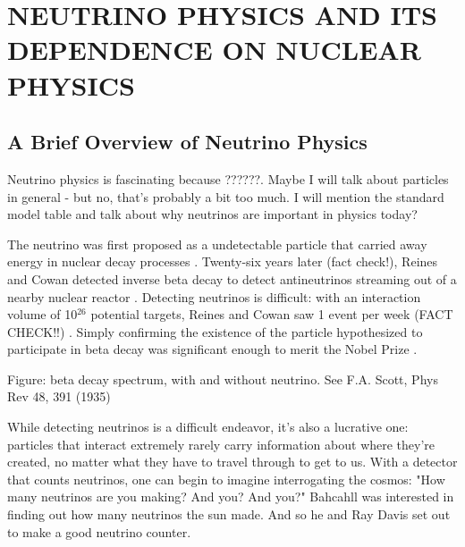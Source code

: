 %
%
%
%
%
%
%
%


%
%

\chapter{NEUTRINO PHYSICS AND ITS DEPENDENCE ON NUCLEAR PHYSICS}

\section{A Brief Overview of Neutrino Physics}
Neutrino physics is fascinating because ??????.
Maybe I will talk about particles in general - but no, that's probably a bit too much.
I will mention the standard model table and talk about why neutrinos are important in physics today?

The neutrino was first proposed as a undetectable particle that carried away energy in nuclear decay processes \citep{Pauli}.  Twenty-six years later (fact check!), Reines and Cowan detected inverse beta decay to detect antineutrinos streaming out of a nearby nuclear reactor \citep{poltergeist}.  Detecting neutrinos is difficult: with an interaction volume of 10$^{26}$ potential targets, Reines and Cowan saw 1 event per week (FACT CHECK!!) \citep{poltergeist}.  Simply confirming the existence of the particle hypothesized to participate in beta decay was significant enough to merit the Nobel Prize \citep{CowanNobel}.

Figure: beta decay spectrum, with and without neutrino.  See F.A. Scott, Phys Rev 48, 391 (1935)

While detecting neutrinos is a difficult endeavor, it's also a lucrative one: particles that interact extremely rarely carry information about where they're created, no matter what they have to travel through to get to us.  With a detector that counts neutrinos, one can begin to imagine interrogating the cosmos: "How many neutrinos are you making?  And you?  And you?"  Bahcahll was interested in finding out how many neutrinos the sun made.  And so he and Ray Davis set out to make a good neutrino counter. 

